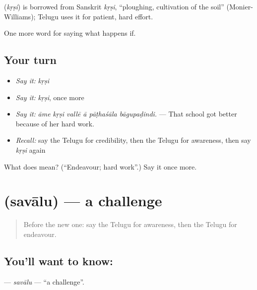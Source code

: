 \begin{cousinweb}
\textbf{} (\emph{kṛṣi}) is borrowed from Sanskrit \emph{kṛṣi}, \textquotedblleft{}ploughing, cultivation of the soil\textquotedblright{} (Monier-Williams); Telugu uses it for patient, hard effort.
\end{cousinweb}

\begin{grammarlens}[title={What you've built}]
One more word for saying what happens if.
\end{grammarlens}

\subsection*{Your turn}
\begin{itemize}
\raggedright
  \item \emph{Say it:} \emph{kṛṣi}
  \item \emph{Say it:} \emph{kṛṣi}, once more
  \item \emph{Say it:} \emph{āme kṛṣi vallē ā pāṭhaśāla bāgupaḍindi.} — That school got better because of her hard work.
  \item \emph{Recall:} say the Telugu for credibility, then the Telugu for awareness, then say \emph{kṛṣi} again
\end{itemize}

\begin{tcolorbox}[breakable,colback=teal!4,colframe=teal!35!black,title={Before you move on}]
What does  mean? (\textquotedblleft{}Endeavour; hard work\textquotedblright{}.) Say it once more.
\end{tcolorbox}
\section[\texorpdfstring{\te{సవాలు} (savālu)}{సవాలు (savālu)}]{ (savālu) — a challenge}

\label{lesson:TE-C433-savalu}



\begin{quote}
Before the new one: say the Telugu for awareness, then the Telugu for endeavour.
\end{quote}

\subsection*{You'll want to know: }
\textbf{} — \emph{savālu} — \textquotedblleft{}a challenge\textquotedblright{}.

